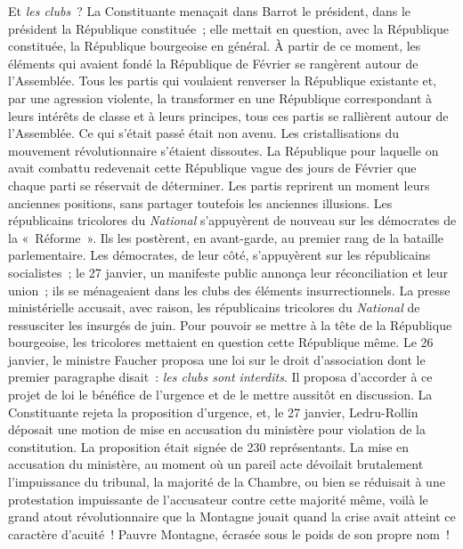 \documentclass[twoside]{book} %
\begin{document}
Et \emph{les clubs} ? La Constituante menaçait dans Barrot le président, dans le président la République constituée ; elle mettait en question, avec la République constituée, la République bourgeoise en général. À partir de ce moment, les éléments qui avaient fondé la République de Février se rangèrent autour de l’Assemblée. Tous les partis qui voulaient renverser la République existante et, par une agression violente, la transformer en une République correspondant à leurs intérêts de classe et à leurs principes, tous ces partis se rallièrent autour de l’Assemblée. Ce qui s’était passé était non avenu. Les cristallisations du mouvement révolutionnaire s’étaient dissoutes. La République pour laquelle on avait combattu redevenait cette République vague des jours de Février que chaque parti se réservait de déterminer. Les partis reprirent un moment leurs anciennes positions, sans partager toutefois les anciennes illusions. Les républicains tricolores du \emph{National} s’appuyèrent de nouveau sur les démocrates de la « Réforme ». Ils les postèrent, en avant-garde, au premier rang de la bataille parlementaire. Les démocrates, de leur côté, s’appuyèrent sur les républicains socialistes ; le 27 janvier, un manifeste public annonça leur réconciliation et leur union ; ils se ménageaient dans les clubs des éléments insurrectionnels. La presse ministérielle accusait, avec raison, les républicains tricolores du \emph{National} de ressusciter les insurgés de juin. Pour pouvoir se mettre à la tête de la République bourgeoise, les tricolores mettaient en question cette République même. Le 26 janvier, le ministre Faucher proposa une loi sur le droit d’association dont le premier paragraphe disait : \emph{les clubs sont interdits}. Il proposa d’accorder à ce projet de loi le bénéfice de l’urgence et de le mettre aussitôt en discussion. La Constituante rejeta la proposition d’urgence, et, le 27 janvier, Ledru-Rollin déposait une motion de mise en accusation du ministère pour violation de la constitution. La proposition était signée de 230 représentants. La mise en accusation du ministère, au moment où un pareil acte dévoilait brutalement l’impuissance du tribunal, la majorité de la Chambre, ou bien se réduisait à une protestation impuissante de l’accusateur contre cette majorité même, voilà le grand atout révolutionnaire que la Montagne jouait quand la crise avait atteint ce caractère d’acuité ! Pauvre Montagne, écrasée sous le poids de son propre nom !\par
\end{document}
